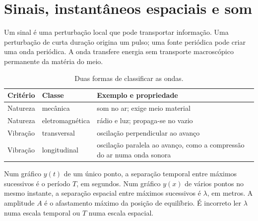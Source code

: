 \documentclass[11pt,a4paper,oneside]{book}
\begin{document}
\section{Sinais, instantâneos espaciais e som}
Um sinal é uma perturbação local que pode transportar informação.
Uma perturbação de curta duração origina um pulso; uma fonte
periódica pode criar uma onda periódica. A onda transfere energia
sem transporte macroscópico permanente da matéria do meio.
\begin{table}[H]
\centering\small
\caption{Duas formas de classificar as ondas.}
\begin{tabularx}{\textwidth}{@{}p{}p{}X@{}}
\toprule
Critério & Classe & Exemplo e propriedade\\\midrule
Natureza & mecânica & som no ar; exige meio material\\
Natureza & eletromagnética & rádio e luz; propaga-se no vazio\\
Vibração & transversal & oscilação perpendicular ao avanço\\
Vibração & longitudinal & oscilação paralela ao avanço,
como a compressão do ar numa onda sonora\\
\bottomrule\end{tabularx}
\end{table}
Num gráfico $y(t)$ de um único ponto, a separação temporal entre
máximos sucessivos é o período $T$, em segundos.
Num gráfico $y(x)$ de vários pontos no mesmo instante,
a separação espacial entre máximos sucessivos é
$\lambda$, em metros. A amplitude $A$ é o afastamento
máximo da posição de equilíbrio. É incorreto ler
$\lambda$ numa escala temporal ou $T$ numa escala espacial.
\begin{center}
\end{center}
\end{document}
